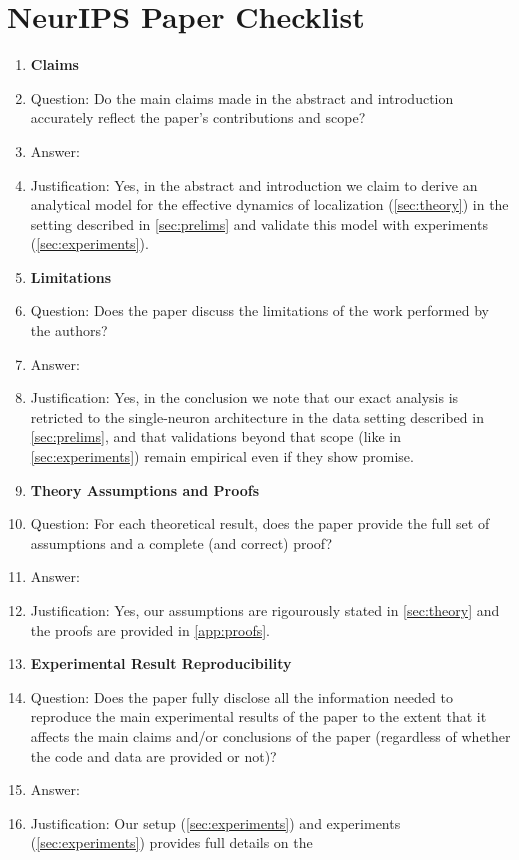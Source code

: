\section*{NeurIPS Paper Checklist}
\begin{enumerate}
\item {\bf Claims}
    \item[] Question: Do the main claims made in the abstract and introduction accurately reflect the paper's contributions and scope?
    \item[] Answer: \answerYes{}
    \item[] Justification: Yes, in the abstract and introduction we claim to derive an 
      analytical model for the effective dynamics of localization (\cref{sec:theory}) 
      in the setting described in \cref{sec:prelims}
      and validate this model with experiments (\cref{sec:experiments}).
\item {\bf Limitations}
    \item[] Question: Does the paper discuss the limitations of the work performed by the authors?
    \item[] Answer: \answerYes{}
    \item[] Justification: Yes, in the conclusion we note that our exact analysis is retricted to 
      the single-neuron architecture  in the data setting described in \cref{sec:prelims},
      and that validations beyond that scope (like in \cref{sec:experiments}) remain empirical even if they show promise.
\item {\bf Theory Assumptions and Proofs}
    \item[] Question: For each theoretical result, does the paper provide the full set of assumptions and a complete (and correct) proof?
    \item[] Answer: \answerYes{}
    \item[] Justification: Yes, our assumptions are rigourously stated in \cref{sec:theory} and the proofs are provided in \cref{app:proofs}.
\item {\bf Experimental Result Reproducibility}
    \item[] Question: Does the paper fully disclose all the information needed to reproduce the main experimental results of the paper to the extent that it affects the main claims and/or conclusions of the paper (regardless of whether the code and data are provided or not)?
    \item[] Answer: \answerYes{}
    \item[] Justification: Our setup (\cref{sec:experiments}) and experiments (\cref{sec:experiments}) provides full details on the 

\end{enumerate}
